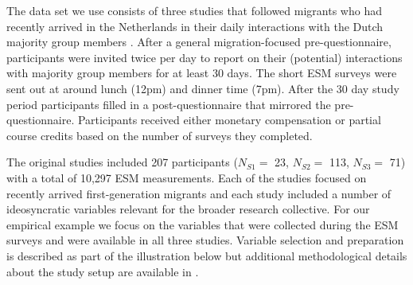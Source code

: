 The data set we use consists of three studies that followed migrants who
had recently arrived in the Netherlands in their daily interactions with
the Dutch majority group members \citet[][]{Kreienkamp2022b}. After a
general migration-focused pre-questionnaire, participants were invited
twice per day to report on their (potential) interactions with majority
group members for at least 30 days. The short ESM surveys were sent out
at around lunch (12pm) and dinner time (7pm). After the 30 day study
period participants filled in a post-questionnaire that mirrored the
pre-questionnaire. Participants received either monetary compensation or
partial course credits based on the number of surveys they completed.

The original studies included 207 participants (\(N_{S1}=\) 23,
\(N_{S2}=\) 113, \(N_{S3}=\) 71) with a total of 10,297 ESM
measurements. Each of the studies focused on recently arrived
first-generation migrants and each study included a number of
ideosyncratic variables relevant for the broader research collective.
For our empirical example we focus on the variables that were collected
during the ESM surveys and were available in all three studies. Variable
selection and preparation is described as part of the illustration below
but additional methodological details about the study setup are
available in \citet[][]{Kreienkamp2022b}.
